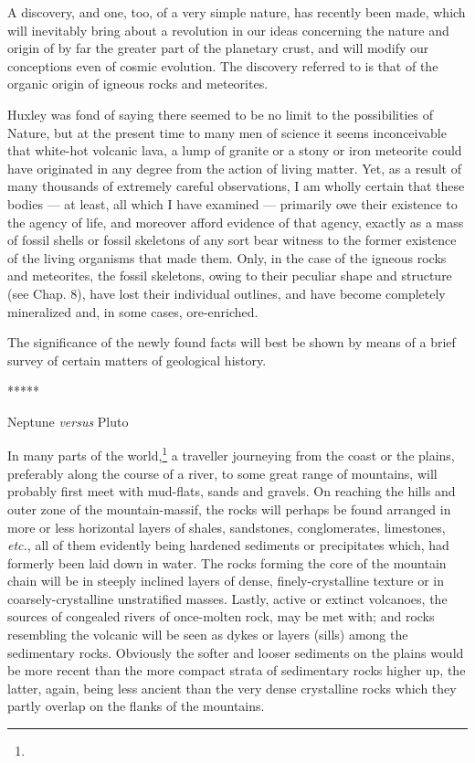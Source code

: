 \documentclass[a4paper, 12pt, oneside]{article}
\begin{document}
A discovery, and one, too, of a very simple nature, has recently been made, which will inevitably bring about a revolution in our ideas concerning the nature and origin of by far the greater part of the planetary crust, and will modify our conceptions even of cosmic evolution. The discovery referred to is that of the organic origin of igneous rocks and meteorites.

Huxley was fond of saying there seemed to be no limit to the possibilities of Nature, but at the present time to many men of science it seems inconceivable that white-hot volcanic lava, a lump of granite or a stony or iron meteorite could have originated in any degree from the action of living matter. Yet, as a result of many thousands of extremely careful observations, I am wholly certain that these bodies --- at least, all which I have examined --- primarily owe their existence to the agency of life, and moreover afford evidence of that agency, exactly as a mass of fossil shells or fossil skeletons of any sort bear witness to the former existence of the living organisms that made them. Only, in the case of the igneous rocks and meteorites, the fossil skeletons, owing to their peculiar shape and structure (see Chap. 8), have lost their individual outlines, and have become completely mineralized and, in some cases, ore-enriched.

The significance of the newly found facts will best be shown by means of a brief survey of certain matters of geological history.

\centerline{*\hspace{15mm}*\hspace{15mm}*\hspace{15mm}*\hspace{15mm}*}
\bigskip

\centerline{Neptune \emph{versus} Pluto}

In many parts of the world,\footnote{} a traveller journeying from the coast or the plains, preferably along the course of a river, to some great range of mountains, will probably first meet with mud-flats, sands and gravels. On reaching the hills and outer zone of the mountain-massif, the rocks will perhaps be found arranged in more or less horizontal layers of shales, sandstones, conglomerates, limestones, \emph{etc.}, all of them evidently being hardened sediments or precipitates which, had formerly been laid down in water. The rocks forming the core of the mountain chain will be in steeply inclined layers of dense, finely-crystalline texture or in coarsely-crystalline unstratified masses. Lastly, active or extinct volcanoes, the sources of congealed rivers of once-molten rock, may be met with; and rocks resembling the volcanic will be seen as dykes or layers (sills) among the sedimentary rocks. Obviously the softer and looser sediments on the plains would be more recent than the more compact strata of sedimentary rocks higher up, the latter, again, being less ancient than the very dense crystalline rocks which they partly overlap on the flanks of the mountains.
\end{document}
